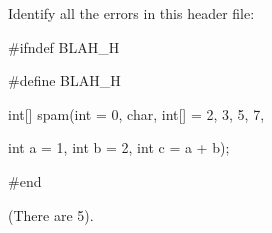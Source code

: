 Identify all the errors in this header file:



\begin{consolethree}[escapeinside=||]

#ifndef BLAH_H

#define BLAH_H



int[] spam(int = 0, char, int[] = {2, 3, 5, 7},

           int a = 1, int b = 2, int c = a + b);



#end

\end{consolethree}



(There are 5).

